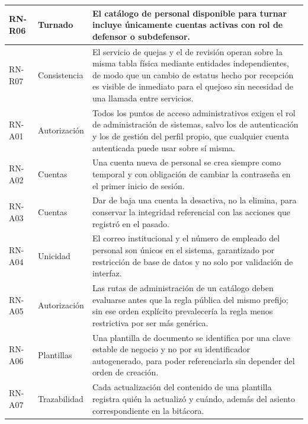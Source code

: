 \begin{longtable}{|p{1.7cm}|p{2.7cm}|p{9.7cm}|}
		RN-R06 & Turnado & El catálogo de personal disponible para turnar incluye únicamente cuentas
		activas con rol de defensor o subdefensor. \\ \hline
	
		RN-R07 & Consistencia & El servicio de quejas y el de revisión operan sobre la misma tabla
		física mediante entidades independientes, de modo que un cambio de estatus hecho por
		recepción es visible de inmediato para el quejoso sin necesidad de una llamada entre
		servicios. \\ \hline
	
		RN-A01 & Autorización & Todos los puntos de acceso administrativos exigen el rol de
		administración de sistemas, salvo los de autenticación y los de gestión del perfil propio,
		que cualquier cuenta autenticada puede usar sobre sí misma. \\ \hline
	
		RN-A02 & Cuentas & Una cuenta nueva de personal se crea siempre como temporal y con
		obligación de cambiar la contraseña en el primer inicio de sesión. \\ \hline
	
		RN-A03 & Cuentas & Dar de baja una cuenta la desactiva, no la elimina, para conservar la
		integridad referencial con las acciones que registró en el pasado. \\ \hline
	
		RN-A04 & Unicidad & El correo institucional y el número de empleado del personal son únicos
		en el sistema, garantizado por restricción de base de datos y no solo por validación de
		interfaz. \\ \hline
	
		RN-A05 & Autorización & Las rutas de administración de un catálogo deben evaluarse antes que
		la regla pública del mismo prefijo; sin ese orden explícito prevalecería la regla menos
		restrictiva por ser más genérica. \\ \hline
	
		RN-A06 & Plantillas & Una plantilla de documento se identifica por una clave estable de
		negocio y no por su identificador autogenerado, para poder referenciarla sin depender del
		orden de creación. \\ \hline
	
		RN-A07 & Trazabilidad & Cada actualización del contenido de una plantilla registra quién la
		actualizó y cuándo, además del asiento correspondiente en la bitácora. \\ \hline
	\end{longtable}
	
